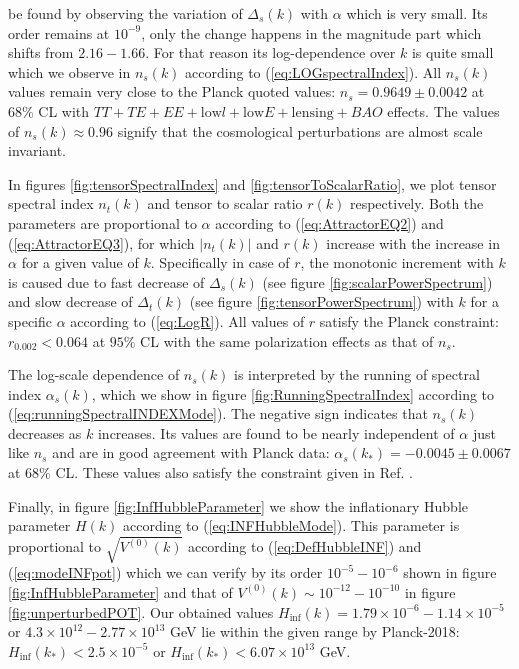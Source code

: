 \documentclass[a4paper,11pt]{article}
\begin{document}
be found by observing the variation of $\Delta_s(k)$ with $\alpha$ which is very small. Its order remains at $10^{-9}$, only the change happens in the magnitude part which shifts from $2.16 - 1.66$. For that reason its log-dependence over $k$ is quite small which we observe in $n_s(k)$ according to (\ref{eq:LOGspectralIndex}). All $n_s(k)$ values remain very close to the Planck quoted values: $n_s=0.9649\pm 0.0042$ at $68\%$ CL with $TT+TE+EE+\mathrm{low}l+\mathrm{low}E+\mathrm{lensing}+BAO$ effects. The values of $n_s(k)\approx 0.96$ signify that the cosmological perturbations are almost scale invariant.\par In figures \ref{fig:tensorSpectralIndex} and \ref{fig:tensorToScalarRatio}, we plot tensor spectral index $n_t(k)$ and tensor to scalar ratio $r(k)$ respectively. Both the parameters are proportional to $\alpha$ according to (\ref{eq:AttractorEQ2}) and (\ref{eq:AttractorEQ3}), for which $|n_t(k)|$ and $r(k)$ increase with the increase in $\alpha$ for a given value of $k$. Specifically in case of $r$, the monotonic increment with $k$ is caused due to fast decrease of $\Delta_s(k)$ (see figure \ref{fig:scalarPowerSpectrum}) and slow decrease of $\Delta_t(k)$ (see figure \ref{fig:tensorPowerSpectrum}) with $k$ for a specific $\alpha$ according to (\ref{eq:LogR}). All values of $r$ satisfy the Planck constraint: $r_{0.002}<0.064$ at $95\%$ CL with the same polarization effects as that of $n_s$.\par The log-scale dependence of $n_s(k)$ is interpreted by the running of spectral index $\alpha_s(k)$, which we show in figure \ref{fig:RunningSpectralIndex} according to (\ref{eq:runningSpectralINDEXMode}). The negative sign indicates that $n_s(k)$ decreases as $k$ increases. Its values are found to be nearly independent of $\alpha$ just like $n_s$ and are in good agreement with Planck data: $\alpha_s(k_{*})=-0.0045\pm 0.0067$ at $68\%$ CL. These values also satisfy the constraint given in Ref. \cite{Dimopoulos:2017zvq}.\par Finally, in figure \ref{fig:InfHubbleParameter} we show the inflationary Hubble parameter $H(k)$ according to (\ref{eq:INFHubbleMode}). This parameter is proportional to $\sqrt{V^{(0)}(k)}$ according to (\ref{eq:DefHubbleINF}) and (\ref{eq:modeINFpot}) which we can verify by its order $10^{-5} - 10^{-6}$ shown in figure \ref{fig:InfHubbleParameter} and that of $V^{(0)}(k)\sim 10^{-12} - 10^{-10}$ in figure \ref{fig:unperturbedPOT}. Our obtained values $H_{\mathrm{inf}}(k)=1.79\times 10^{-6} - 1.14\times 10^{-5}$ or $4.3\times 10^{12} - 2.77\times 10^{13}$ GeV lie within the given range by Planck-2018: $H_{\mathrm{inf}}(k_{*})<2.5\times 10^{-5}$ or $H_{\mathrm{inf}}(k_{*})<6.07\times 10^{13}$ GeV.
\end{document}
